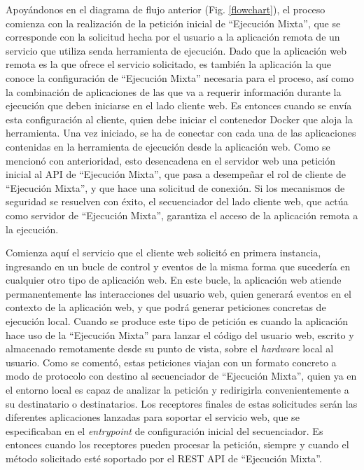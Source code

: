 Apoyándonos en el diagrama de flujo anterior (Fig. \ref{flowchart}), el proceso comienza con la realización de la petición inicial de ``Ejecución Mixta'', que se corresponde con la solicitud hecha por el usuario a la aplicación remota de un servicio que utiliza senda herramienta de ejecución. Dado que la aplicación web remota es la que ofrece el servicio solicitado, es también la aplicación la que conoce la configuración de ``Ejecución Mixta'' necesaria para el proceso, así como la combinación de aplicaciones de las que va a requerir información durante la ejecución que deben iniciarse en el lado cliente web. Es entonces cuando se envía esta configuración al cliente, quien debe iniciar el contenedor Docker que aloja la herramienta. Una vez iniciado, se ha de conectar con cada una de las aplicaciones contenidas en la herramienta de ejecución desde la aplicación web. Como se mencionó con anterioridad, esto desencadena en el servidor web una petición inicial al API de ``Ejecución Mixta'', que pasa a desempeñar el rol de cliente de ``Ejecución Mixta'', y que hace una solicitud de conexión. Si los mecanismos de seguridad se resuelven con éxito, el secuenciador del lado cliente web, que actúa como servidor de ``Ejecución Mixta'', garantiza el acceso de la aplicación remota a la ejecución. 

Comienza aquí el servicio que el cliente web solicitó en primera instancia, ingresando en un bucle de control y eventos de la misma forma que sucedería en cualquier otro tipo de aplicación web. En este bucle, la aplicación web atiende permanentemente las interacciones del usuario web, quien generará eventos en el contexto de la aplicación web, y que podrá generar peticiones concretas de ejecución local. Cuando se produce este tipo de petición es cuando la aplicación hace uso de la ``Ejecución Mixta'' para lanzar el código del usuario web, escrito y almacenado remotamente desde su punto de vista, sobre el \textit{hardware} local al usuario. Como se comentó, estas peticiones viajan con un formato concreto a modo de protocolo con destino al secuenciador de ``Ejecución Mixta'', quien ya en el entorno local es capaz de analizar la petición y redirigirla convenientemente a su destinatario o destinatarios. Los receptores finales de estas solicitudes serán las diferentes aplicaciones lanzadas para soportar el servicio web, que se especificaban en el \textit{entrypoint} de configuración inicial del secuenciador. Es entonces cuando los receptores pueden procesar la petición, siempre y cuando el método solicitado esté soportado por el REST API de ``Ejecución Mixta''.

